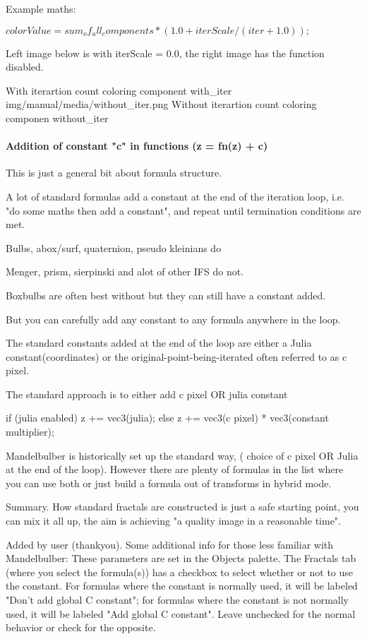 Example maths:

$colorValue =  sum_of_all_components *  ( 1.0 + iterScale / ( iter + 1.0));$

Left image below is with iterScale = 0.0, the right image has the function disabled.

{With iterartion count coloring component}
{with_iter}
{img/manual/media/without_iter.png}
{Without iterartion count coloring componen}
{without_iter}


\paragraph{Addition of constant "c" in functions (z = fn(z) + c)}
This is just a general bit about formula structure.

A lot of standard formulas add a constant at the end of the iteration loop, i.e. "do some maths then add a constant", and repeat until termination conditions are met.

Bulbs, abox/surf, quaternion, pseudo kleinians do

Menger, prism, sierpinski and alot of other IFS do not.

Boxbulbs are often best without but they can still have a constant added.

But you can carefully add any constant to any formula anywhere in the loop.

The standard constants added at the end of the loop are either a Julia constant(coordinates) or the original-point-being-iterated often referred to as c pixel.

The standard approach is to either add c pixel OR julia constant

if (julia enabled) z += vec3(julia);
else z += vec3(c pixel) * vec3(constant multiplier);

Mandelbulber is historically set up the standard way, ( choice of c pixel OR Julia at the end of the loop).
However there are plenty of formulas in the list where you can use both or just build a formula out of transforms in hybrid mode.

Summary. How standard fractals are constructed is just a safe starting point, you can mix it all up, the aim is achieving "a quality image in a reasonable time".


Added by user (thankyou).
 Some additional info for those less familiar with Mandelbulber: These parameters are set in the Objects palette. The Fractals tab (where you select the formula(s)) has a checkbox to select whether or not to use the constant. For formulas where the constant is normally used, it will be labeled "Don't add global C constant"; for formulas where the constant is not normally used, it will be labeled "Add global C constant". Leave unchecked for the normal behavior or check for the opposite.


